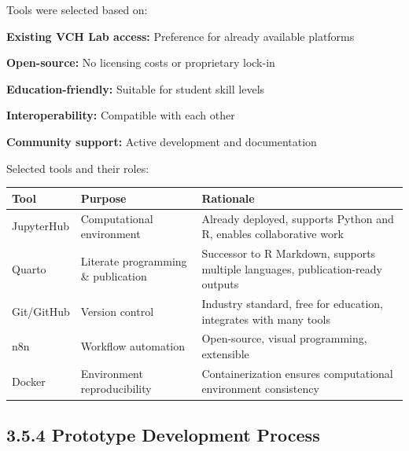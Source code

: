 \documentclass[
  oneside,
  open=any]{scrbook}
\begin{document}
Tools were selected based on:

\textbf{Existing VCH Lab access:} Preference for already available
platforms

\textbf{Open-source:} No licensing costs or proprietary lock-in

\textbf{Education-friendly:} Suitable for student skill levels

\textbf{Interoperability:} Compatible with each other

\textbf{Community support:} Active development and documentation

Selected tools and their roles:

\begin{longtable}[]{@{}
  >{\raggedright\arraybackslash}p{}
  >{\raggedright\arraybackslash}p{}
  >{\raggedright\arraybackslash}p{}@{}}
\toprule\noalign{}
\begin{minipage}[b]{\linewidth}\raggedright
Tool
\end{minipage} & \begin{minipage}[b]{\linewidth}\raggedright
Purpose
\end{minipage} & \begin{minipage}[b]{\linewidth}\raggedright
Rationale
\end{minipage} \\
\midrule\noalign{}
\endhead
\bottomrule\noalign{}
\endlastfoot
JupyterHub & Computational environment & Already deployed, supports
Python and R, enables collaborative work \\
Quarto & Literate programming \& publication & Successor to R Markdown,
supports multiple languages, publication-ready outputs \\
Git/GitHub & Version control & Industry standard, free for education,
integrates with many tools \\
n8n & Workflow automation & Open-source, visual programming,
extensible \\
Docker & Environment reproducibility & Containerization ensures
computational environment consistency \\
\end{longtable}

\subsection{3.5.4 Prototype Development
Process}\label{prototype-development-process}
\end{document}
